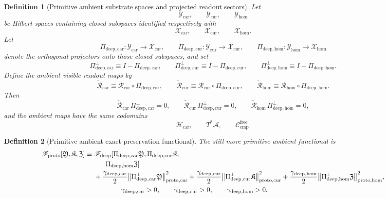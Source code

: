 \documentclass[11pt]{article}
\newcommand{\Sub}{\mathcal A}
\newcommand{\CompFree}{\mathscr C_{\mathrm{cmp}}^{\mathrm{free}}}
\newcommand{\DeepFunctional}{\mathscr F_{\mathrm{deep}}}
\newcommand{\ProtoFunctional}{\mathscr F_{\mathrm{proto}}}
\newcommand{\CarrierClass}{\mathscr H_{\mathrm{car}}}
\newcommand{\DeepTensorClass}{\mathscr X_{\mathrm{car}}}
\newcommand{\DeepRelabelClass}{\mathscr X_{\mathrm{cur}}}
\newcommand{\DeepFreeClass}{\mathscr X_{\mathrm{hom}}}
\newcommand{\CarRead}{\mathcal R_{\mathrm{car}}}
\newcommand{\CurRead}{\mathcal R_{\mathrm{cur}}}
\newcommand{\HomRead}{\mathcal R_{\mathrm{hom}}}
\newcommand{\ProtoTensorClass}{\mathscr Y_{\mathrm{car}}}
\newcommand{\ProtoRelabelClass}{\mathscr Y_{\mathrm{cur}}}
\newcommand{\ProtoFreeClass}{\mathscr Y_{\mathrm{hom}}}
\newcommand{\ProtoTensor}{\mathfrak Y}
\newcommand{\ProtoRelabel}{\mathfrak K}
\newcommand{\ProtoFree}{\mathfrak Z}
\newcommand{\ProtoCarProj}{\Pi_{\mathrm{deep,car}}}
\newcommand{\ProtoCurProj}{\Pi_{\mathrm{deep,cur}}}
\newcommand{\ProtoHomProj}{\Pi_{\mathrm{deep,hom}}}
\newcommand{\ProtoCarPerp}{\Pi_{\mathrm{deep,car}}^{\perp}}
\newcommand{\ProtoCurPerp}{\Pi_{\mathrm{deep,cur}}^{\perp}}
\newcommand{\ProtoHomPerp}{\Pi_{\mathrm{deep,hom}}^{\perp}}
\newcommand{\ProtoCarRead}{\widetilde{\mathcal R}_{\mathrm{car}}}
\newcommand{\ProtoCurRead}{\widetilde{\mathcal R}_{\mathrm{cur}}}
\newcommand{\ProtoHomRead}{\widetilde{\mathcal R}_{\mathrm{hom}}}
\newcommand{\ProtoCarGap}{\gamma_{\mathrm{deep,car}}}
\newcommand{\ProtoCurGap}{\gamma_{\mathrm{deep,cur}}}
\newcommand{\ProtoHomGap}{\gamma_{\mathrm{deep,hom}}}
\newtheorem{definition}{Definition}
\begin{document}
\begin{definition}[Primitive ambient substrate spaces and projected readout sectors]
\label{def:proto}
Let
\[
\ProtoTensorClass,\qquad
\ProtoRelabelClass,\qquad
\ProtoFreeClass
\]
be Hilbert spaces containing closed subspaces identified respectively with
\[
\DeepTensorClass,\qquad
\DeepRelabelClass,\qquad
\DeepFreeClass.
\]
Let
\begin{equation}
\ProtoCarProj:\ProtoTensorClass\to\DeepTensorClass,
\qquad
\ProtoCurProj:\ProtoRelabelClass\to\DeepRelabelClass,
\qquad
\ProtoHomProj:\ProtoFreeClass\to\DeepFreeClass
\label{eq:proto_proj}
\end{equation}
denote the orthogonal projectors onto those closed subspaces, and set
\begin{equation}
\ProtoCarPerp\equiv I-\ProtoCarProj,
\qquad
\ProtoCurPerp\equiv I-\ProtoCurProj,
\qquad
\ProtoHomPerp\equiv I-\ProtoHomProj.
\label{eq:proto_perp}
\end{equation}
Define the ambient visible readout maps by
\begin{equation}
\ProtoCarRead\equiv \CarRead\circ\ProtoCarProj,
\qquad
\ProtoCurRead\equiv \CurRead\circ\ProtoCurProj,
\qquad
\ProtoHomRead\equiv \HomRead\circ\ProtoHomProj.
\label{eq:proto_maps}
\end{equation}
Then
\begin{equation}
\ProtoCarRead\,\ProtoCarPerp=0,
\qquad
\ProtoCurRead\,\ProtoCurPerp=0,
\qquad
\ProtoHomRead\,\ProtoHomPerp=0,
\label{eq:proto_kill}
\end{equation}
and the ambient maps have the same codomains
\[
\CarrierClass,\qquad
T^*\Sub,\qquad
\CompFree.
\]
\end{definition}

\begin{definition}[Primitive ambient exact-preservation functional]
\label{def:Fproto}
The still more primitive ambient functional is
\begin{equation}
\begin{aligned}
\ProtoFunctional[\ProtoTensor,\ProtoRelabel,\ProtoFree]
\equiv\;
&\DeepFunctional[
\ProtoCarProj\ProtoTensor,\ProtoCurProj\ProtoRelabel,
\\
&\hspace{1.7em}\ProtoHomProj\ProtoFree]
\\
&+\frac{\ProtoCarGap}{2}\norm{\ProtoCarPerp\ProtoTensor}_{\mathrm{proto,car}}^2
+\frac{\ProtoCurGap}{2}\norm{\ProtoCurPerp\ProtoRelabel}_{\mathrm{proto,cur}}^2
+\frac{\ProtoHomGap}{2}\norm{\ProtoHomPerp\ProtoFree}_{\mathrm{proto,hom}}^2,
\\
&\qquad\qquad
\ProtoCarGap>0,\qquad
\ProtoCurGap>0,\qquad
\ProtoHomGap>0.
\end{aligned}
\label{eq:Fproto}
\end{equation}
\end{definition}
\end{document}
